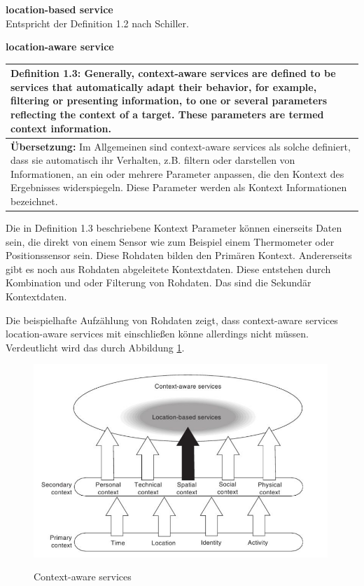 \textbf{location-based service} \\
Entspricht der Definition 1.2 nach Schiller.


\textbf{location-aware service} \\
\begin{table}[h]
	\centering
	\begin{tabular}{|p{16cm}|}\hline
		\textbf{Definition 1.3:} \glqq Generally, context-aware services are defined to be services that automatically adapt their behavior, for example, filtering or presenting information, to one or several parameters reflecting the context of a target. These parameters are termed context information.\grqq \cite[S.2]{Kuepper2005}\\ \hline
		\textbf{Übersetzung:} Im Allgemeinen sind context-aware services als solche definiert, dass sie automatisch ihr Verhalten, z.B. filtern oder darstellen von Informationen, an ein oder mehrere Parameter anpassen, die den Kontext des Ergebnisses widerspiegeln. Diese Parameter werden als Kontext Informationen bezeichnet. \\ \hline
	\end{tabular}
\end{table}

Die in Definition 1.3 beschriebene Kontext Parameter können einerseits Daten sein, die direkt von einem Sensor wie zum Beispiel einem Thermometer oder Positionssensor sein. Diese Rohdaten bilden den Primären Kontext. Andererseits gibt es noch aus Rohdaten abgeleitete Kontextdaten. Diese entstehen durch Kombination und oder Filterung von Rohdaten. Das sind die Sekundär Kontextdaten. 
\cite[S.2]{Kuepper2005}

Die beispielhafte Aufzählung von Rohdaten zeigt, dass context-aware services location-aware services mit einschließen könne allerdings nicht müssen. Verdeutlicht wird das durch Abbildung \ref{fig:context-aware services}.


\begin{figure}[h]
\centering
\includegraphics[width=0.99\textwidth]{ref/images/definitionK.png}
\caption[Context-aware services]{Context-aware services}
\label{fig:context-aware services}
\cite[S. 2]{Kuepper2005}
\end{figure}

